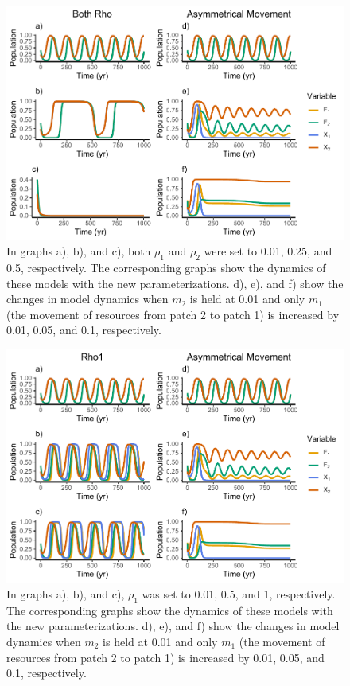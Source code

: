 \documentclass[
]{article}
\begin{document}
\begin{figure}
\centering
\includegraphics{ReviewerMovementTest_files/figure-latex/MovementBothRho-1.pdf}
\caption{\label{fig:MovementBothRho}In graphs a), b), and c), both \(\rho_1\) and \(\rho_2\) were set to 0.01, 0.25, and 0.5, respectively. The corresponding graphs show the dynamics of these models with the new parameterizations. d), e), and f) show the changes in model dynamics when \(m_2\) is held at 0.01 and only \(m_1\) (the movement of resources from patch 2 to patch 1) is increased by 0.01, 0.05, and 0.1, respectively. \label{MovementBothRho}}
\end{figure}



\begin{figure}
\centering
\includegraphics{ReviewerMovementTest_files/figure-latex/MovementOneRho-1.pdf}
\caption{\label{fig:MovementOneRho}In graphs a), b), and c), \(\rho_1\) was set to 0.01, 0.5, and 1, respectively. The corresponding graphs show the dynamics of these models with the new parameterizations. d), e), and f) show the changes in model dynamics when \(m_2\) is held at 0.01 and only \(m_1\) (the movement of resources from patch 2 to patch 1) is increased by 0.01, 0.05, and 0.1, respectively. \label{MovementOneRho}}
\end{figure}
\end{document}
